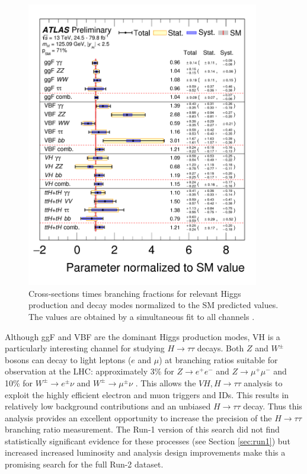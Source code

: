 \begin{figure}[htb!]
    \centering
    \includegraphics[width=4in]{figures/chapter6/higgs_comb_plot.png}
    \caption{Cross-sections times branching fractions for relevant Higgs production and decay modes normalized to the SM predicted values. The values are obtained by a simultaneous fit to all channels \cite{higgs_comb_paper}.}
    \label{fig:higgs_comb}
\end{figure}

Although ggF and VBF are the dominant Higgs production modes, VH is a particularly interesting channel for studying $H\rightarrow\tau\tau$ decays. Both $Z$ and $W^{\pm}$ bosons can decay to light leptons ($e$ and $\mu$) at branching ratios suitable for observation at the LHC: approximately 3\% for $Z\rightarrow e^+e^-$ and $Z\rightarrow\mu^+\mu^-$ and 10\% for $W^{\pm}\rightarrow e^{\pm}\nu$ and $W^{\pm}\rightarrow \mu^{\pm}\nu$ \cite{pdg}. This allows the $VH,H\rightarrow\tau\tau$ analysis to exploit the highly efficient electron and muon triggers and IDs. This results in relatively low background contributions and  an unbiased $H\rightarrow\tau\tau$ decay. Thus this analysis provides an excellent opportunity to increase the precision of the $H\rightarrow\tau\tau$ branching ratio measurement. The Run-1 version of this search did not find statistically significant evidence for these processes (see Section \ref{sec:run1}) but increased increased luminosity and analysis design improvements make this a promising search for the full Run-2 dataset.

